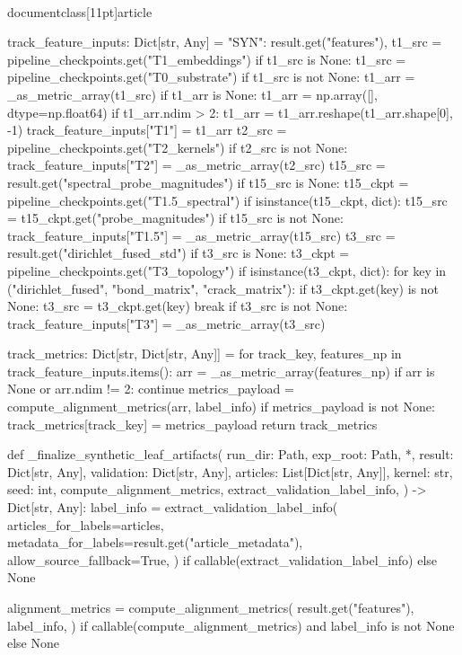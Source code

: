 \\documentclass[11pt]{article}
\begin{document}
\begin{CodeBlock}
    track_feature_inputs: Dict[str, Any] = {
        "SYN": result.get("features"),
    }
    t1_src = pipeline_checkpoints.get("T1_embeddings")
    if t1_src is None:
        t1_src = pipeline_checkpoints.get("T0_substrate")
    if t1_src is not None:
        t1_arr = _as_metric_array(t1_src)
        if t1_arr is None:
            t1_arr = np.array([], dtype=np.float64)
        if t1_arr.ndim > 2:
            t1_arr = t1_arr.reshape(t1_arr.shape[0], -1)
        track_feature_inputs["T1"] = t1_arr
    t2_src = pipeline_checkpoints.get("T2_kernels")
    if t2_src is not None:
        track_feature_inputs["T2"] = _as_metric_array(t2_src)
    t15_src = result.get("spectral_probe_magnitudes")
    if t15_src is None:
        t15_ckpt = pipeline_checkpoints.get("T1.5_spectral")
        if isinstance(t15_ckpt, dict):
            t15_src = t15_ckpt.get("probe_magnitudes")
    if t15_src is not None:
        track_feature_inputs["T1.5"] = _as_metric_array(t15_src)
    t3_src = result.get("dirichlet_fused_std")
    if t3_src is None:
        t3_ckpt = pipeline_checkpoints.get("T3_topology")
        if isinstance(t3_ckpt, dict):
            for key in ("dirichlet_fused", "bond_matrix", "crack_matrix"):
                if t3_ckpt.get(key) is not None:
                    t3_src = t3_ckpt.get(key)
                    break
    if t3_src is not None:
        track_feature_inputs["T3"] = _as_metric_array(t3_src)

    track_metrics: Dict[str, Dict[str, Any]] = {}
    for track_key, features_np in track_feature_inputs.items():
        arr = _as_metric_array(features_np)
        if arr is None or arr.ndim != 2:
            continue
        metrics_payload = compute_alignment_metrics(arr, label_info)
        if metrics_payload is not None:
            track_metrics[track_key] = metrics_payload
    return track_metrics


def _finalize_synthetic_leaf_artifacts(
    run_dir: Path,
    exp_root: Path,
    *,
    result: Dict[str, Any],
    validation: Dict[str, Any],
    articles: List[Dict[str, Any]],
    kernel: str,
    seed: int,
    compute_alignment_metrics,
    extract_validation_label_info,
) -> Dict[str, Any]:
    label_info = extract_validation_label_info(
        articles_for_labels=articles,
        metadata_for_labels=result.get("article_metadata"),
        allow_source_fallback=True,
    ) if callable(extract_validation_label_info) else None

    alignment_metrics = compute_alignment_metrics(
        result.get("features"),
        label_info,
    ) if callable(compute_alignment_metrics) and label_info is not None else None


\end{CodeBlock}
\end{document}

